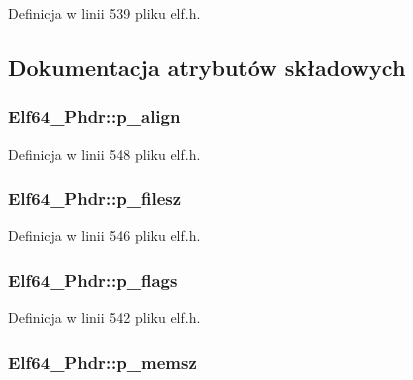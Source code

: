 Definicja w linii 539 pliku elf.\-h.



\subsection{Dokumentacja atrybutów składowych}
\hypertarget{struct_elf64___phdr_aa89a4b1835998c8866e821d777a2f879}{
\subsubsection[{p\-\_\-align}]{ Elf64\-\_\-\-Phdr\-::p\-\_\-align}}\label{struct_elf64___phdr_aa89a4b1835998c8866e821d777a2f879}


Definicja w linii 548 pliku elf.\-h.

\hypertarget{struct_elf64___phdr_af50e5756da2acda5ccb02ebaa3367092}{
\subsubsection[{p\-\_\-filesz}]{ Elf64\-\_\-\-Phdr\-::p\-\_\-filesz}}\label{struct_elf64___phdr_af50e5756da2acda5ccb02ebaa3367092}


Definicja w linii 546 pliku elf.\-h.

\hypertarget{struct_elf64___phdr_ab96e7784733c2192a76d5a42897cb38b}{
\subsubsection[{p\-\_\-flags}]{ Elf64\-\_\-\-Phdr\-::p\-\_\-flags}}\label{struct_elf64___phdr_ab96e7784733c2192a76d5a42897cb38b}


Definicja w linii 542 pliku elf.\-h.

\hypertarget{struct_elf64___phdr_a55fae01175fc4e3f1c23e52b14459235}{
\subsubsection[{p\-\_\-memsz}]{ Elf64\-\_\-\-Phdr\-::p\-\_\-memsz}}\label{struct_elf64___phdr_a55fae01175fc4e3f1c23e52b14459235}


